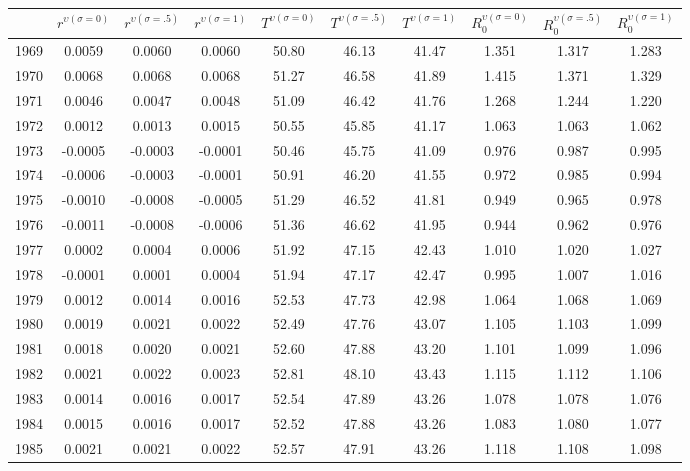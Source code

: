 \begin{tabular}{cccccccccc}
  \hline
 & $r^{\upsilon (\sigma = 0)}$ & $r^{\upsilon (\sigma = .5)}$ & $r^{\upsilon (\sigma = 1)}$ & $T^{\upsilon (\sigma = 0)}$ & $T^{\upsilon (\sigma = .5)}$ & $T^{\upsilon (\sigma = 1)}$ & $R_0^{\upsilon (\sigma = 0)}$ & $R_0^{\upsilon (\sigma = .5)}$ & $R_0^{\upsilon (\sigma = 1)}$ \\ 
  \hline
1969 & 0.0059 & 0.0060 & 0.0060 & 50.80 & 46.13 & 41.47 & 1.351 & 1.317 & 1.283 \\ 
  1970 & 0.0068 & 0.0068 & 0.0068 & 51.27 & 46.58 & 41.89 & 1.415 & 1.371 & 1.329 \\ 
  1971 & 0.0046 & 0.0047 & 0.0048 & 51.09 & 46.42 & 41.76 & 1.268 & 1.244 & 1.220 \\ 
  1972 & 0.0012 & 0.0013 & 0.0015 & 50.55 & 45.85 & 41.17 & 1.063 & 1.063 & 1.062 \\ 
  1973 & -0.0005 & -0.0003 & -0.0001 & 50.46 & 45.75 & 41.09 & 0.976 & 0.987 & 0.995 \\ 
  1974 & -0.0006 & -0.0003 & -0.0001 & 50.91 & 46.20 & 41.55 & 0.972 & 0.985 & 0.994 \\ 
  1975 & -0.0010 & -0.0008 & -0.0005 & 51.29 & 46.52 & 41.81 & 0.949 & 0.965 & 0.978 \\ 
  1976 & -0.0011 & -0.0008 & -0.0006 & 51.36 & 46.62 & 41.95 & 0.944 & 0.962 & 0.976 \\ 
  1977 & 0.0002 & 0.0004 & 0.0006 & 51.92 & 47.15 & 42.43 & 1.010 & 1.020 & 1.027 \\ 
  1978 & -0.0001 & 0.0001 & 0.0004 & 51.94 & 47.17 & 42.47 & 0.995 & 1.007 & 1.016 \\ 
  1979 & 0.0012 & 0.0014 & 0.0016 & 52.53 & 47.73 & 42.98 & 1.064 & 1.068 & 1.069 \\ 
  1980 & 0.0019 & 0.0021 & 0.0022 & 52.49 & 47.76 & 43.07 & 1.105 & 1.103 & 1.099 \\ 
  1981 & 0.0018 & 0.0020 & 0.0021 & 52.60 & 47.88 & 43.20 & 1.101 & 1.099 & 1.096 \\ 
  1982 & 0.0021 & 0.0022 & 0.0023 & 52.81 & 48.10 & 43.43 & 1.115 & 1.112 & 1.106 \\ 
  1983 & 0.0014 & 0.0016 & 0.0017 & 52.54 & 47.89 & 43.26 & 1.078 & 1.078 & 1.076 \\ 
  1984 & 0.0015 & 0.0016 & 0.0017 & 52.52 & 47.88 & 43.26 & 1.083 & 1.080 & 1.077 \\ 
  1985 & 0.0021 & 0.0021 & 0.0022 & 52.57 & 47.91 & 43.26 & 1.118 & 1.108 & 1.098 \\ 

\end{tabular}
